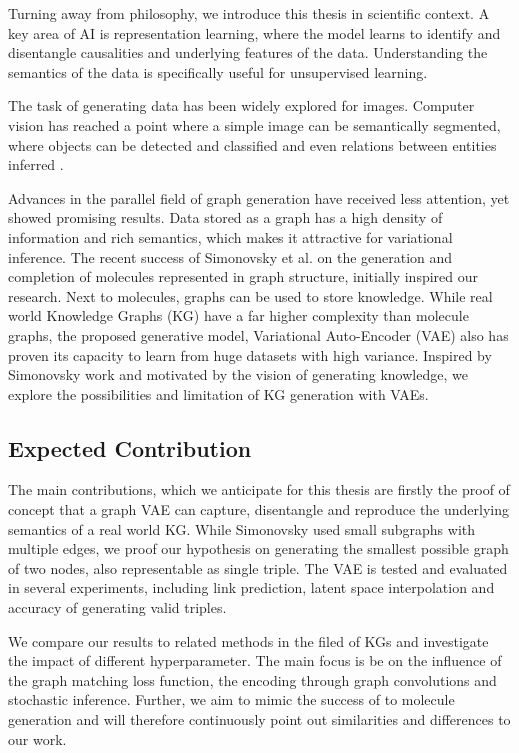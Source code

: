 Turning away from philosophy, we introduce this thesis in scientific context. A key area of AI is representation learning, where the model learns to identify and disentangle causalities and underlying features of the data. Understanding the semantics of the data is specifically useful for unsupervised learning. 


The task of generating data has been widely explored for images. Computer vision has reached a point where a simple image can be semantically segmented, where objects can be detected and classified and even relations between entities inferred \cite{kipf_contrastive_2020}.


Advances in the parallel field of graph generation have received less attention, yet showed promising results. Data stored as a graph has a high density of information and rich semantics, which makes it attractive for variational inference. The recent success of Simonovsky et al. \cite{simonovsky_graphvae_2018} on the generation and completion of molecules represented in graph structure, initially inspired our research. Next to molecules, graphs can be used to store knowledge. While real world Knowledge Graphs (KG) have a far higher complexity than molecule graphs, the proposed generative model, Variational Auto-Encoder (VAE) also has proven its capacity to learn from huge datasets with high variance. Inspired by Simonovsky work and motivated by the vision of generating knowledge, we explore the possibilities and limitation of KG generation with VAEs.



\subsection{Expected Contribution}

The main contributions, which we anticipate for this thesis are firstly the proof of concept that a graph VAE can capture, disentangle and reproduce the underlying semantics of a real world KG. While Simonovsky used small subgraphs with multiple edges, we proof our hypothesis on  generating the smallest possible graph of two nodes, also representable as single triple. The VAE is tested and evaluated in several experiments, including link prediction, latent space interpolation and accuracy of generating valid triples.


We compare our results to related methods in the filed of KGs and investigate the impact of different hyperparameter. The main focus is be on the influence of the graph matching loss function, the encoding through graph convolutions and stochastic inference. Further, we aim to mimic the success of to molecule generation and will therefore continuously point out similarities and differences to our work.

